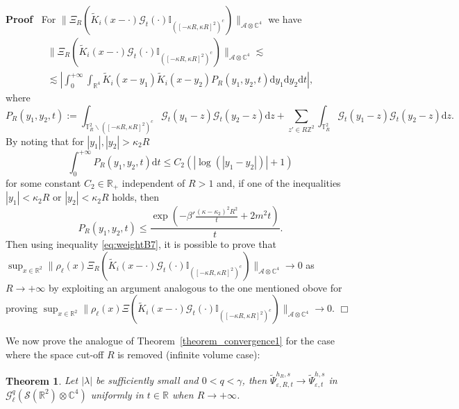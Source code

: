\documentclass{article}
\newcommand{\assign}{:=}
\newcommand{\mathd}{\mathrm{d}}
\newcommand{\nobracket}{}
\newenvironment{proof}{\noindent\textbf{Proof\ }}{\hspace*{\fill}$\Box$\medskip}
\newtheorem{theorem}{Theorem}
\begin{document}
\begin{proof}
  For $\| \Xi_R (\tilde{K}_i (x - \cdot) \mathcal{G}_t (\cdot) \mathbb{I}_{([-
  \kappa R, \kappa R]^2)^c}) \|_{\mathcal{A} \otimes \mathbb{C}^4}$ we have
  \begin{equation}
    \begin{array}{c}
      \| \Xi_R (\tilde{K}_i (x - \cdot) \mathcal{G}_t (\cdot) \mathbb{I}_{([-
      \kappa R, \kappa R]^2)^c}) \|_{\mathcal{A} \otimes \mathbb{C}^4}
      \lesssim\\
      \lesssim \left| \int_0^{+ \infty} \int_{\mathbb{R}^4} \tilde{K}_i (x -
      y_1) \tilde{K}_i (x - y_2) \nobracket \nobracket P_R (y_1, y_2, t)
      \mathd y_1 \mathd y_2 \mathd t \right|,
    \end{array} \label{eq:weightB7}
  \end{equation}
  where
  \[ P_R (y_1, y_2, t) \assign \int_{\mathbb{T}_R^2 \backslash ([- \kappa R,
     \kappa R]^2)^c} \mathcal{G}_t (y_1 - z) \mathcal{G}_t (y_2 - z) \mathd z
     + \sum_{z' \in R\mathbb{Z}^2} \int_{\mathbb{T}_R^2} \mathcal{G}_t (y_1 -
     z) \mathcal{G}_t (y_2 - z) \mathd z. \]
  By noting that for $| y_1 |, | y_2 | > \kappa_2 R$
  \[ \int_0^{+ \infty} P_R (y_1, y_2, t) \mathd t \leqslant C_2 (| \log (| y_1
     - y_2 |) | + 1) \]
  for some constant $C_2 \in \mathbb{R}_+$ independent of $R > 1$ and, if one
  of the inequalities $| y_1 | < \kappa_2 R$ or $| y_2 | < \kappa_2 R$ holds,
  then
  \[ P_R (y_1, y_2, t) \leqslant \frac{\exp \left( - \beta' \frac{(\kappa -
     \kappa_2)^2 R^2}{t} + 2 m^2 t \right)}{t} . \]
  Then using inequality {\eqref{eq:weightB7}}, it is possible to prove that
  $\sup_{x \in \mathbb{R}^2} \| \rho_{\ell} (x) \Xi_R (\tilde{K}_i (x - \cdot)
  \mathcal{G}_t (\cdot) \mathbb{I}_{([- \kappa R, \kappa R]^2)^c})
  \|_{\mathcal{A} \otimes \mathbb{C}^4} \rightarrow 0$ as $R \rightarrow +
  \infty$ by exploiting an argument analogous to the one mentioned obove for
  proving $\sup_{x \in \mathbb{R}^2} \| \rho_{\ell} (x) \Xi (\tilde{K}_i (x -
  \cdot) \mathcal{G}_t (\cdot) \mathbb{I}_{([- \kappa R, \kappa R]^2)^c})
  \|_{\mathcal{A} \otimes \mathbb{C}^4} \rightarrow 0$.
\end{proof}

We now prove the analogue of Theorem~\ref{theorem_convergence1} for the case
where the space cut-off $R$ is removed (infinite volume case):

\begin{theorem}
  \label{theorem_torusplane}Let $| \lambda |$ be sufficiently small and $0 < q
  < \gamma$, then $\tilde{\Psi}_{\varepsilon, R, t}^{h_R, s} \rightarrow
  \tilde{\Psi}_{\varepsilon, t}^{h, s}$ in $\mathcal{G}^q_{\ell} (\mathcal{S}
  (\mathbb{R}^2) \otimes \mathbb{C}^4)$ uniformly in $t \in \mathbb{R}$ when
  $R \rightarrow + \infty$.
\end{theorem}
\end{document}
